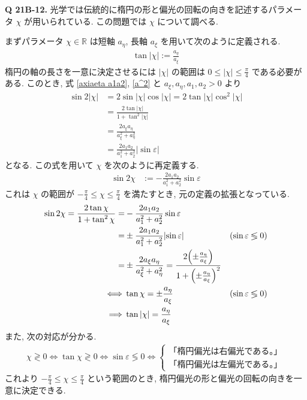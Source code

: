 \documentclass[uplatex,dvipdfmx,a4paper,11pt]{jlreq}
\newcommand{\RR}{\mathbb{R}}
\theoremstyle{definition}
\begin{document}
\textbf{Q 21B-12.}
光学では伝統的に楕円の形と偏光の回転の向きを記述するパラメータ $\chi$ が用いられている. この問題では $\chi$ について調べる.

まずパラメータ $\chi\in\RR$ は短軸 $a_\eta$, 長軸 $a_\xi$ を用いて次のように定義される.
\begin{align}
  \tan{|\chi|} := \frac{a_\eta}{a_\xi}
\end{align}
楕円の軸の長さを一意に決定させるには $|\chi|$ の範囲は $0 \leq |\chi| \leq \frac{\pi}{4}$ である必要がある. このとき, 式 \eqref{axiaeta a1a2}, \eqref{a^2} と $a_\xi, a_\eta, a_1, a_2 > 0$ より
\begin{align}
  \sin{2|\chi|} & = 2\sin|\chi|\cos|\chi| = 2\tan|\chi|\cos^2|\chi|           \\
                & = \frac{2\tan|\chi|}{1 + \tan^2|\chi|}                      \\
                & = \frac{2a_\xi a_\eta}{a_\xi^2 + a_\eta^2}                  \\
                & = \frac{2a_1 a_2}{a_1^2 + a_2^2}\lvert\sin\varepsilon\rvert
\end{align}
となる. この式を用いて $\chi$ を次のように再定義する.
\begin{align}
  \sin{2\chi} & := -\frac{2a_1 a_2}{a_1^2 + a_2^2}\sin\varepsilon \label{chi def}
\end{align}
これは $\chi$ の範囲が $-\frac{\pi}{4} \leq \chi \leq \frac{\pi}{4}$ を満たすとき, 元の定義の拡張となっている.
\begin{align}
  \sin2\chi = \frac{2\tan\chi}{1 + \tan^2\chi}
  =        & -\frac{2a_1 a_2}{a_1^2 + a_2^2}\sin\varepsilon                                                                                                          \\
  =        & \pm\frac{2a_1 a_2}{a_1^2 + a_2^2}\lvert\sin\varepsilon\rvert                                                             & (\sin\varepsilon \lessgtr 0) \\
  =        & \pm\frac{2a_\xi a_\eta}{a_\xi^2 + a_\eta^2} = \frac{2\qty(\pm\frac{a_\eta}{a_\xi})}{1 + \qty(\pm\frac{a_\eta}{a_\xi})^2}                                \\
  \iff     & \tan\chi = \pm\frac{a_\eta}{a_\xi}                                                                                       & (\sin\varepsilon \lessgtr 0) \\
  \implies & \tan|\chi| = \frac{a_\eta}{a_\xi}
\end{align}
また, 次の対応が分かる.
\begin{align}
  \chi \gtrless 0 \iff \tan\chi \gtrless 0 \iff \sin\varepsilon \lessgtr 0 \iff
  \begin{cases}
    \textrm{「楕円偏光は右偏光である。」} \\
    \textrm{「楕円偏光は左偏光である。」}
  \end{cases}
\end{align}
これより $-\frac{\pi}{4} \leq \chi \leq \frac{\pi}{4}$ という範囲のとき, 楕円偏光の形と偏光の回転の向きを一意に決定できる. \\
\end{document}
